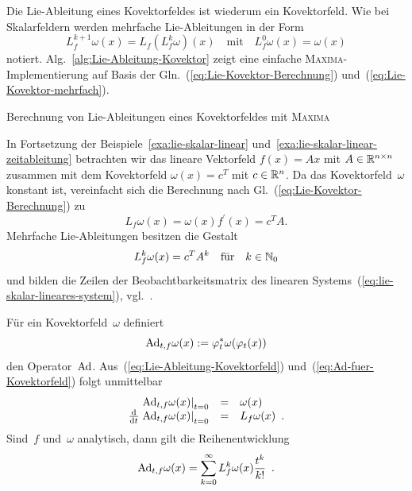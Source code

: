 Die Lie-Ableitung eines Kovektorfeldes ist wiederum ein Kovektorfeld.
Wie bei Skalarfeldern werden mehrfache Lie-Ableitungen in der Form
\begin{equation}
L_{f}^{k+1}\omega(x)=L_{f}\left(L_{f}^{k}\omega\right)(x)\quad\mbox{mit}\quad L_{f}^{0}\omega(x)=\omega(x)\label{eq:Lie-Kovektor-mehrfach}
\end{equation}
notiert. Alg.~\ref{alg:Lie-Ableitung-Kovektor} zeigt eine einfache
\textsc{Maxima}-Implementierung auf Basis der Gln.~(\ref{eq:Lie-Kovektor-Berechnung})
und~(\ref{eq:Lie-Kovektor-mehrfach}).\medskip{}

\begin{algorithm}


\caption{Berechnung von Lie-Ableitungen eines Kovektorfeldes mit \textsc{Maxima\label{alg:Lie-Ableitung-Kovektor}}}
\end{algorithm}

\begin{example}
\label{exa:Lie-Kovektor-lineares System}In Fortsetzung der Beispiele~\ref{exa:lie-skalar-linear}
und~\ref{exa:lie-skalar-linear-zeitableitung} betrachten wir das
lineare Vektorfeld $f(x)=Ax$ mit $A\in{\mathbb{R}}^{n\times n}$ zusammen mit
dem Kovektorfeld $\omega(x)=c^{T}$ mit $c\in{\mathbb{R}}^{n}$. Da das Kovektorfeld~$\omega$
konstant ist, vereinfacht sich die Berechnung nach Gl.~(\ref{eq:Lie-Kovektor-Berechnung})
zu 
\[
L_{f}\omega(x)=\omega(x)f^{\prime}(x)=c^{T}A.
\]
Mehrfache Lie-Ableitungen besitzen die Gestalt 
\[
L_{f}^{k}\omega(x)=c^{T}A^{k}\quad\text{für}\quad k\in{\mathbb{N}_0}
\]
und bilden die Zeilen der Beobachtbarkeitsmatrix des linearen Systems~(\ref{eq:lie-skalar-lineares-system}),
vgl.~\cite{lunze-rt2}.
\end{example}

Für ein Kovektorfeld~$\omega$ definiert 
\begin{equation}
{\operatorname{Ad}}_{t,f}\omega(x):=\varphi_{t}^{*}\omega(\varphi_{t}(x))\label{eq:Ad-fuer-Kovektorfeld}
\end{equation}
den Operator~${\operatorname{Ad}}$. Aus~(\ref{eq:Lie-Ableitung-Kovektorfeld})
und~(\ref{eq:Ad-fuer-Kovektorfeld}) folgt unmittelbar 
\[
\begin{array}{rcl}
\left.{\operatorname{Ad}}_{t,f}\omega(x)\right|_{t=0} & = & \omega(x)\\
{\frac{{\mathrm{d}}}{{\mathrm{d}} t}\left.{\operatorname{Ad}}_{t,f}\omega(x)\right|}_{t=0} & = & L_{f}\omega(x)\enspace.
\end{array}
\]
Sind~$f$ und~$\omega$ analytisch, dann gilt die Reihenentwicklung
\[
{\operatorname{Ad}}_{t,f}\omega(x)=\sum_{k=0}^{\infty}L_{f}^{k}\omega(x)\frac{t^{k}}{k!}\enspace.
\]

